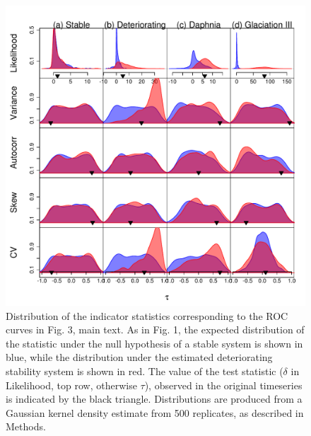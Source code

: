 \documentclass[11pt]{elsarticle}
\begin{document}
\begin{figure}[ht]
  \begin{center}
    \includegraphics{FigS1.pdf}
  \end{center}
  \caption{Distribution of the indicator statistics corresponding to the ROC curves in Fig. 3, main text. As in Fig. 1, the expected distribution of the statistic under the null hypothesis of a stable system is shown in blue, while the distribution under the estimated deteriorating stability system is shown in red.  The value of the test statistic ($\delta$ in Likelihood, top row, otherwise $\tau$), observed in the original timeseries is indicated by the black triangle. Distributions are produced from a Gaussian kernel density estimate from 500 replicates, as described in Methods.}
  \label{fig:S1}
\end{figure}
\end{document}
